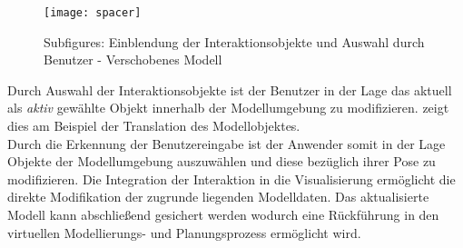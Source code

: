 \begin{figure}[!ht]
	\begin{center}
		\texttt{[image: spacer]}
		\caption{Subfigures: Einblendung der Interaktionsobjekte und Auswahl durch Benutzer - Verschobenes Modell}
		\label{fig.intarrows}
	\end{center}
\end{figure} 

Durch Auswahl der Interaktionsobjekte ist der Benutzer in der Lage das aktuell als \textit{aktiv} gewählte Objekt innerhalb der Modellumgebung zu modifizieren.  \red[(b)] zeigt dies am Beispiel der Translation des Modellobjektes. \\

Durch die Erkennung der Benutzereingabe ist der Anwender somit in der Lage Objekte der Modellumgebung auszuwählen und diese bezüglich ihrer Pose zu modifizieren. Die Integration der Interaktion in die Visualisierung ermöglicht die direkte Modifikation der zugrunde liegenden Modelldaten. Das aktualisierte Modell kann abschließend gesichert werden wodurch eine Rückführung in den virtuellen Modellierungs- und Planungsprozess ermöglicht wird.


